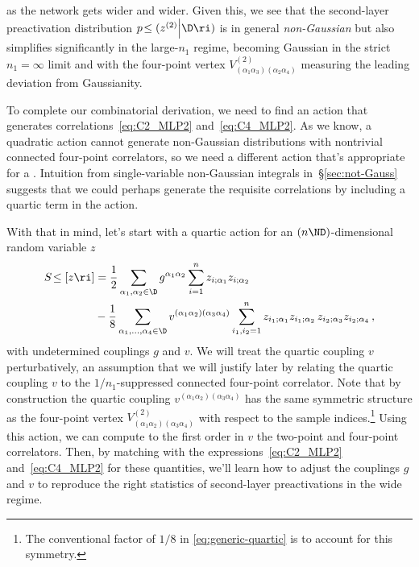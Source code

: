 as the network gets wider and wider. 
Given this, we see that the second-layer preactivation distribution $p\!\le(z^{(2)}\Big\vert\D\ri)$ is in general \emph{non-Gaussian}
but also simplifies significantly in the large-$n_1$ regime, becoming Gaussian in the strict $n_1=\infty$ limit and with the four-point vertex $V^{(2)}_{(\alpha_1\alpha_3)(\alpha_2\alpha_4)}$ measuring the leading deviation from Gaussianity.




To complete our combinatorial derivation, we need to find an action that generates correlations~\eqref{eq:C2_MLP2} and~\eqref{eq:C4_MLP2}.
As we know, a quadratic action cannot generate non-Gaussian distributions with nontrivial connected four-point correlators, so we need a different action that's appropriate for a . Intuition from single-variable non-Gaussian integrals in~\S\ref{sec:not-Gauss} suggests that we could perhaps generate the requisite correlations by including a quartic term in the action.





With that in mind, let's start with a quartic action for an $(n \ND)$-dimensional random variable $z$
\begin{align}\label{eq:generic-quartic}
S\!\le[z\ri]&=\frac{1}{2}\sum_{\alpha_1,\alpha_{2}\in\D}g^{\alpha_1\alpha_2}\sum_{i=1}^{n} z_{i;\alpha_1}z_{i;\alpha_2}\, \nonumber\\
&-\frac{1}{8}\sum_{\alpha_1,\ldots,\alpha_4\in\D}v^{(\alpha_1\alpha_2)(\alpha_3\alpha_4)}\sum_{i_1,i_2=1}^{n} z_{i_1;\alpha_1}z_{i_1;\alpha_2} \, z_{i_2;\alpha_3}z_{i_2;\alpha_4} \, ,
\end{align}
with undetermined couplings $g$ and $v$.
We will treat the quartic coupling $v$ perturbatively, an assumption that we will justify later by relating the quartic coupling $v$ to the $1/n_1$-suppressed connected four-point correlator.
Note that by construction the quartic coupling $v^{(\alpha_1\alpha_2)(\alpha_3\alpha_4)}$ has the same symmetric structure as the four-point vertex $V^{(2)}_{(\alpha_1\alpha_2)(\alpha_3\alpha_4)}$ with respect to the sample indices.\footnote{The conventional factor of $1/8$ in \eqref{eq:generic-quartic} is to account for this symmetry.}
Using this action, we can compute to the first order in $v$ the two-point and four-point correlators. Then, by matching with the expressions~\eqref{eq:C2_MLP2} and~\eqref{eq:C4_MLP2} for these quantities, we'll learn how to adjust the couplings $g$ and $v$ to reproduce the right statistics of second-layer preactivations in the wide regime.

